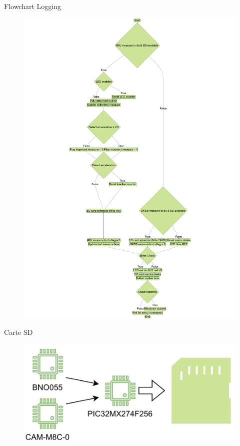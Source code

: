 \documentclass{beamer}
\begin{document}
\begin{frame}{Flowchart Logging}
	\begin{figure}[!h]
		\centering
		\includegraphics[height=.9\textheight]{../figures/code/diagrammes/logging-flowchart}
		\label{fig:pdfresizer}
	\end{figure}
\end{frame}

\begin{frame}{Carte SD}
	\begin{figure}[h]
		\centering
		\includegraphics[width=0.6\linewidth]{../figures/code/Illustration-SD-per}
		\label{fig:illustration-sd-per}
	\end{figure}
\end{frame}
\end{document}
